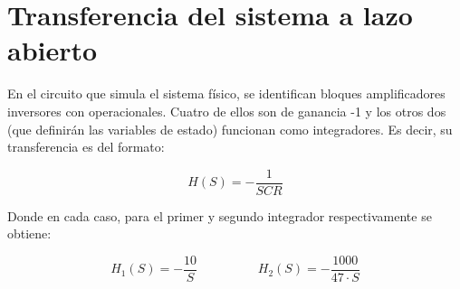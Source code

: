 \documentclass{article}
\begin{document}
\newgeometry{} %



\tableofcontents
\newpage

\section{Transferencia del sistema a lazo abierto}

En el circuito que simula el sistema físico, se identifican bloques amplificadores inversores con operacionales. Cuatro de ellos son de ganancia -1 y los otros dos (que definirán las variables de estado) funcionan como integradores. Es decir, su transferencia es del formato:

\[
H(S) = -\frac{1}{SCR}
\]

Donde en cada caso, para el primer y segundo integrador respectivamente se obtiene:

\[
H_1(S) = -\frac{10}{S} \hspace{2cm} H_2(S) = -\frac{1000}{47 \cdot S}
\]
\end{document}
